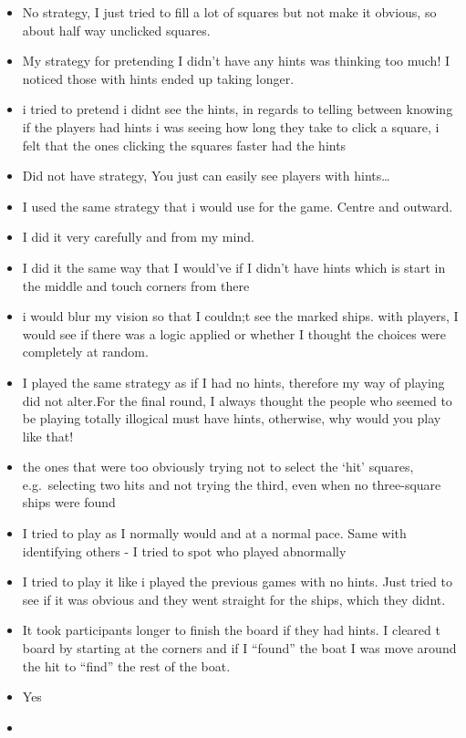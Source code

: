 \documentclass[
  english,
  man]{apa6}
\providecommand{\tightlist}{%
  \setlength{\itemsep}{0pt}\setlength{\parskip}{0pt}}
\begin{document}
\begin{itemize}
\tightlist
\item
  No strategy, I just tried to fill a lot of squares but not make it obvious, so about half way unclicked squares.
\item
  My strategy for pretending I didn't have any hints was thinking too much! I noticed those with hints ended up taking longer.
\item
  i tried to pretend i didnt see the hints, in regards to telling between knowing if the players had hints i was seeing how long they take to click a square, i felt that the ones clicking the squares faster had the hints
\item
  Did not have strategy, You just can easily see players with hints\ldots{}
\item
  I used the same strategy that i would use for the game. Centre and outward.
\item
  I did it very carefully and from my mind.
\item
  I did it the same way that I would've if I didn't have hints which is start in the middle and touch corners from there
\item
  i would blur my vision so that I couldn;t see the marked ships. with players, I would see if there was a logic applied or whether I thought the choices were completely at random.
\item
  I played the same strategy as if I had no hints, therefore my way of playing did not alter.For the final round, I always thought the people who seemed to be playing totally illogical must have hints, otherwise, why would you play like that!
\item
  the ones that were too obviously trying not to select the `hit' squares, e.g.~selecting two hits and not trying the third, even when no three-square ships were found
\item
  I tried to play as I normally would and at a normal pace. Same with identifying others - I tried to spot who played abnormally
\item
  I tried to play it like i played the previous games with no hints. Just tried to see if it was obvious and they went straight for the ships, which they didnt.
\item
  It took participants longer to finish the board if they had hints. I cleared t board by starting at the corners and if I ``found'' the boat I was move around the hit to ``find'' the rest of the boat.
\item
  Yes
\item

\end{itemize}
\end{document}
